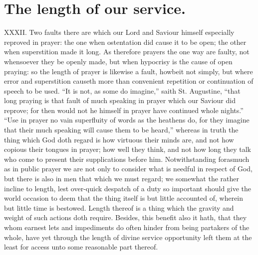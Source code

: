 \section*{The length of our service.}
XXXII. Two faults there are which our Lord and Saviour himself especially reproved in prayer: the one when ostentation did cause it to be open; the other when superstition  made it long. As therefore prayers the one way are faulty, not whensoever they be openly made, but when hypocrisy is the cause of open praying: so the length of prayer is likewise a fault, howbeit not simply, but where error and superstition causeth more than convenient repetition or continuation of speech to be used. “It is not, as some do imagine,” saith St. Augustine, “that long praying is that fault of much speaking in prayer which our Saviour did reprove; for then would not he himself in prayer have continued whole nights.” “Use in prayer no vain superfluity of words as the heathens do, for they imagine that their much speaking will cause them to be heard,” whereas in truth the thing which God doth regard is how virtuous their minds are, and not how copious their tongues in prayer; how well they think, and not how long they talk who come to present their supplications before him.
Notwithstanding forasmuch as in public prayer we are not only to consider what is needful in respect of God, but there is also in men that which we must regard; we somewhat the rather incline to length, lest over-quick despatch of a duty so important should give the world occasion to deem that the thing itself is but little accounted of, wherein but little time is bestowed. Length thereof is a thing which the gravity and weight of such actions doth require.
Besides, this benefit also it hath, that they whom earnest lets and impediments do often hinder from being partakers of the whole, have yet through the length of divine service opportunity left them at the least for access unto some reasonable part thereof.
